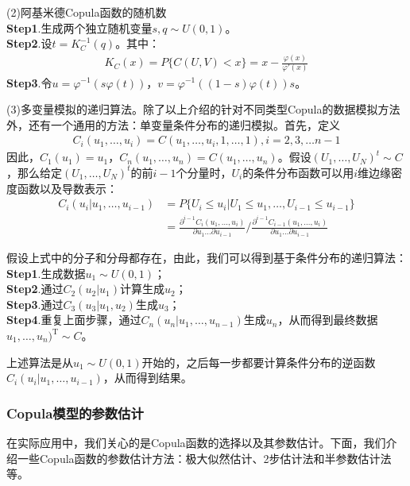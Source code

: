             \par
            (2)阿基米德Copula函数的随机数\\
            \textbf{Step1}.生成两个独立随机变量$s,q\sim U(0,1)$。\\
            \textbf{Step2}.设$t = K_C^{-1}(q)$。其中：
            \begin{align*}
            K_C(x) = P\{C(U,V)<x\} = x-\frac{\varphi(x)}{\varphi'(x)}
            \end{align*}
            \textbf{Step3}.令$u = \varphi^{-1}(s\varphi(t))$，$v = \varphi^{-1}((1-s)\varphi(t))s$。
            \par
            (3)多变量模拟的递归算法。除了以上介绍的针对不同类型Copula的数据模拟方法外，还有一个通用的方法：单变量条件分布的递归模拟。首先，定义
            \begin{align*}
            C_i(u_1,\dots,u_i) = C(u_1,\dots,u_i,1,\dots,1),i =2,3,\dots n-1
            \end{align*}
            因此，$C_1(u_1) = u_1$，$C_n(u_1,\dots,u_n) = C(u_1,\dots,u_n)$。假设$(U_1,\dots,U_N)^t \sim C$，那么给定$(U_1,\dots,U_N)^t $的前$i-1$个分量时，$U_i$的条件分布函数可以用$i$维边缘密度函数以及导数表示：
            \begin{align*}
            C_i(u_i|u_1,\dots,u_{i-1}) &= P\{ U_i \leqslant u_i|U_1 \leqslant u_1,\dots,U_{i-1} \leqslant u_{i-1} \}\\
            &=\frac{\partial^{i-1} C_i(u_1,\dots,u_i) }{\partial u_1\dots\partial u_{i-1}} \biggl/\frac{\partial^{i-1} C_{i-1}(u_1,\dots,u_i) }{\partial u_1\dots\partial u_{i-1}}
            \end{align*}
            \par
            假设上式中的分子和分母都存在，由此，我们可以得到基于条件分布的递归算法：\\
            \textbf{Step1}.生成数据$u_1\sim U(0,1)$；\\
            \textbf{Step2}.通过$C_2(u_2|u_1)$计算生成$u_2$；\\
            \textbf{Step3}.通过$C_3(u_3|u_1,u_2)$生成$u_3$；\\
            \textbf{Step4}.重复上面步骤，通过$C_n(u_n|u_1,\dots,u_{n-1})$生成$u_n$，从而得到最终数据$u_1,\dots,u_n)^{\mathrm{T}} \sim C$。
            \par
            上述算法是从$u_1\sim U(0,1)$开始的，之后每一步都要计算条件分布的逆函数$C_i(u_i|u_1,\dots,u_{i-1})$，从而得到结果。

        \subsubsection{Copula模型的参数估计}
            \par
            在实际应用中，我们关心的是Copula函数的选择以及其参数估计。下面，我们介绍一些Copula函数的参数估计方法：极大似然估计、2步估计法和半参数估计法等。
